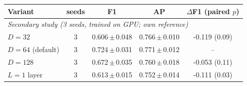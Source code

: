 \begin{tabular}{lcccc}
\toprule
Variant & seeds & F1 & AP & $\Delta$F1 (paired $p$)\\
\midrule
\midrule\multicolumn{5}{l}{\textit{Secondary study (3 seeds, trained on GPU; own reference)}}\\
$D=32$ & 3 & 0.606\,$\pm$\,0.048 & 0.766\,$\pm$\,0.010 & -0.119 (0.09)\\
$D=64$ (default) & 3 & 0.724\,$\pm$\,0.031 & 0.771\,$\pm$\,0.012 & --\\
$D=128$ & 3 & 0.672\,$\pm$\,0.035 & 0.760\,$\pm$\,0.018 & -0.053 (0.11)\\
$L=1$ layer & 3 & 0.613\,$\pm$\,0.015 & 0.752\,$\pm$\,0.014 & -0.111 (0.03)\\
\bottomrule
\end{tabular}
